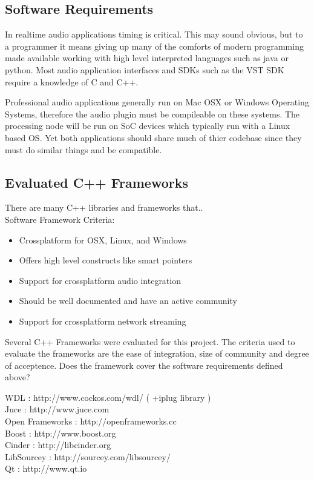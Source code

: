 \subsection{Software Requirements}

In realtime audio applications timing is critical. This may sound obvious, but to a programmer it means giving up many of the comforts of modern programming made available working with high level interpreted languages such as java or python. Most audio application interfaces and SDKs such as the VST SDK require a knowledge of C and C++.

Professional audio applications generally run on Mac OSX or Windows Operating Systems, therefore the audio plugin must be compileable on these systems. The processing node will be run on SoC devices which typically run with a Linux based OS. Yet both applications should share much of thier codebase since they must do similar things and be compatible.

\subsection{Evaluated C++ Frameworks}

There are many C++ libraries and frameworks that..\\

Software Framework Criteria:

\begin{itemize}

\item Crossplatform for OSX, Linux, and Windows
\item Offers high level constructs like smart pointers
\item Support for crossplatform audio integration
\item Should be well documented and have an active community
\item Support for crossplatform network streaming

\end{itemize}

Several C++ Frameworks were evaluated for this project. The criteria used to evaluate the frameworks are the ease of
integration, size of community and degree of acceptence. Does the framework cover the software requirements defined
above?

WDL : http://www.cockos.com/wdl/ ( +iplug library ) \\
Juce : http://www.juce.com \\
Open Frameworks : http://openframeworks.cc \\
Boost : http://www.boost.org \\
Cinder : http://libcinder.org \\
LibSourcey : http://sourcey.com/libsourcey/ \\
Qt : http://www.qt.io \\


